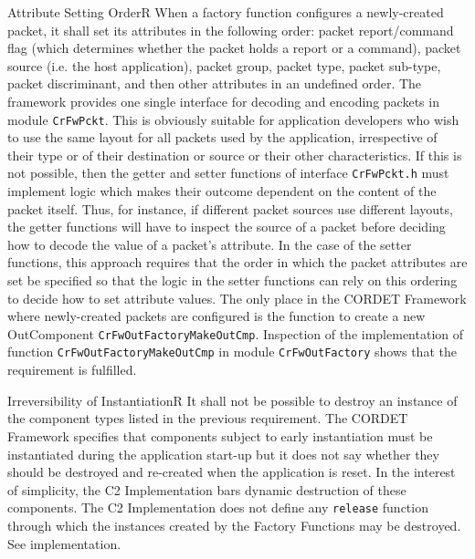 \documentclass{pnp_article}
\begin{document}
\begin{fwReq}{Attribute Setting Order}{R}
{When a factory function configures a newly-created packet, it shall set its attributes in the following order: packet report/command flag (which determines whether the packet holds a report or a command), packet source (i.e. the host application), packet group, packet type, packet sub-type, packet discriminant, and then other attributes in an undefined order.}
{The framework provides one single interface for decoding and encoding packets in module \texttt{CrFwPckt}. This is obviously suitable for application developers who wish to use the same layout for all packets used by the application, irrespective of their type or of their destination or source or their other characteristics. If this is not possible, then the getter and setter functions of interface \texttt{CrFwPckt.h} must implement logic which makes their outcome dependent on the content of the packet itself. Thus, for instance, if different packet sources use different layouts, the getter functions will have to inspect the source of a packet before deciding how to decode the value of a packet's attribute. In the case of the setter functions, this approach requires that the order in which the packet attributes are set be specified so that the logic in the setter functions can rely on this ordering to decide how to set attribute values. }
{The only place in the CORDET Framework where newly-created packets are configured is the function to create a new OutComponent \texttt{CrFwOutFactoryMakeOutCmp}.} 
{Inspection of the implementation of function \texttt{CrFwOutFactoryMakeOutCmp} in module \texttt{CrFwOutFactory} shows that the requirement is fulfilled.}
\end{fwReq}


\begin{fwReq}{Irreversibility of Instantiation}{R}
{It shall not be possible to destroy an instance of the component types listed in the previous requirement.}
{The CORDET Framework specifies that components subject to early instantiation must be instantiated during the application start-up but it does not say whether they should be destroyed and re-created when the application is reset. In the interest of simplicity, the C2 Implementation bars dynamic destruction of these components.}
{The C2 Implementation does not define any \texttt{release} function through which the instances created by the Factory Functions may be destroyed. } 
{See implementation.}
\end{fwReq}
\end{document}
